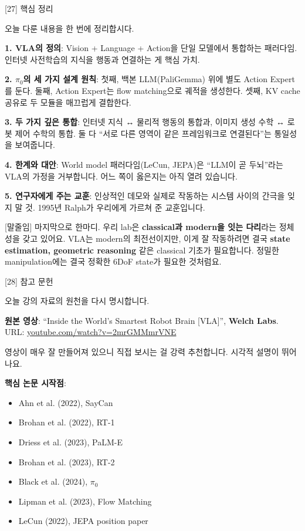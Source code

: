 \documentclass[aspectratio=169,10pt]{beamer}
\newenvironment{script}{%
  \footnotesize
  \setlength{\parskip}{0.5em}
  \setlength{\parindent}{0pt}
}{}
\begin{document}
\begin{frame}{[27] 핵심 정리}
\begin{script}
오늘 다룬 내용을 한 번에 정리합시다.

\textbf{1. VLA의 정의}: Vision + Language + Action을 단일 모델에서 통합하는 패러다임. 인터넷 사전학습의 지식을 행동과 연결하는 게 핵심 가치.

\textbf{2. $\pi_0$의 세 가지 설계 원칙}: 첫째, 백본 LLM(PaliGemma) 위에 별도 Action Expert를 둔다. 둘째, Action Expert는 flow matching으로 궤적을 생성한다. 셋째, KV cache 공유로 두 모듈을 매끄럽게 결합한다.

\textbf{3. 두 가지 깊은 통합}: 인터넷 지식 ↔ 물리적 행동의 통합과, 이미지 생성 수학 ↔ 로봇 제어 수학의 통합. 둘 다 ``서로 다른 영역이 같은 프레임워크로 연결된다''는 통일성을 보여줍니다.

\textbf{4. 한계와 대안}: World model 패러다임(LeCun, JEPA)은 ``LLM이 곧 두뇌''라는 VLA의 가정을 거부합니다. 어느 쪽이 옳은지는 아직 열려 있습니다.

\textbf{5. 연구자에게 주는 교훈}: 인상적인 데모와 실제로 작동하는 시스템 사이의 간극을 잊지 말 것. 1995년 Ralph가 우리에게 가르쳐 준 교훈입니다.

[말줄임] 마지막으로 한마디. 우리 lab은 \textbf{classical과 modern을 잇는 다리}라는 정체성을 갖고 있어요. VLA는 modern의 최전선이지만, 이게 잘 작동하려면 결국 \textbf{state estimation, geometric reasoning} 같은 classical 기초가 필요합니다. 정밀한 manipulation에는 결국 정확한 6DoF state가 필요한 것처럼요.
\end{script}
\end{frame}

\begin{frame}{[28] 참고 문헌}
\begin{script}
오늘 강의 자료의 원천을 다시 명시합니다.

\textbf{원본 영상}: ``Inside the World's Smartest Robot Brain [VLA]'', \textbf{Welch Labs}.\\
URL: \href{https://www.youtube.com/watch?v=2mrGMMmrVNE}{youtube.com/watch?v=2mrGMMmrVNE}

영상이 매우 잘 만들어져 있으니 직접 보시는 걸 강력 추천합니다. 시각적 설명이 뛰어나요.

\textbf{핵심 논문 시작점}:
\begin{itemize}
  \footnotesize
  \item Ahn et al. (2022), SayCan
  \item Brohan et al. (2022), RT-1
  \item Driess et al. (2023), PaLM-E
  \item Brohan et al. (2023), RT-2
  \item Black et al. (2024), $\pi_0$
  \item Lipman et al. (2023), Flow Matching
  \item LeCun (2022), JEPA position paper
\end{itemize}
\end{script}
\end{frame}
\end{document}
